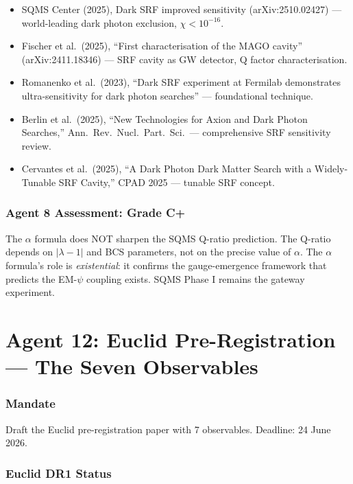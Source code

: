 \documentclass[11pt,a4paper]{article}
\begin{document}
\begin{itemize}
\item SQMS Center (2025), Dark SRF improved sensitivity (arXiv:2510.02427) --- world-leading dark photon exclusion, $\chi < 10^{-16}$.
\item Fischer et al.\ (2025), ``First characterisation of the MAGO cavity'' (arXiv:2411.18346) --- SRF cavity as GW detector, Q factor characterisation.
\item Romanenko et al.\ (2023), ``Dark SRF experiment at Fermilab demonstrates ultra-sensitivity for dark photon searches'' --- foundational technique.
\item Berlin et al.\ (2025), ``New Technologies for Axion and Dark Photon Searches,'' Ann.\ Rev.\ Nucl.\ Part.\ Sci.\ --- comprehensive SRF sensitivity review.
\item Cervantes et al.\ (2025), ``A Dark Photon Dark Matter Search with a Widely-Tunable SRF Cavity,'' CPAD 2025 --- tunable SRF concept.
\end{itemize}

\section{Agent 8 Assessment: Grade C+}

The $\alpha$ formula does NOT sharpen the SQMS Q-ratio prediction. The Q-ratio depends on $|\lambda - 1|$ and BCS parameters, not on the precise value of $\alpha$. The $\alpha$ formula's role is \emph{existential}: it confirms the gauge-emergence framework that predicts the EM-$\psi$ coupling exists. SQMS Phase I remains the gateway experiment.


\part{Agent 12: Euclid Pre-Registration --- The Seven Observables}
\label{part:agent12}

\section{Mandate}
Draft the Euclid pre-registration paper with 7 observables. Deadline: 24 June 2026.

\section{Euclid DR1 Status}
\end{document}
